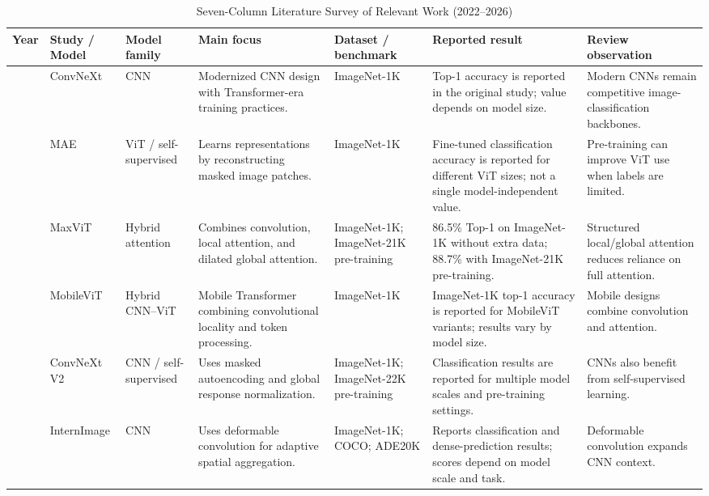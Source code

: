 \documentclass[conference]{IEEEtran}
\begin{document}
\begin{table}[!t]
\caption{Seven-Column Literature Survey of Relevant Work (2022--2026)}
\label{tab:recent_literature}
\centering
\tiny
\setlength{\tabcolsep}{2pt}
\renewcommand{\arraystretch}{0.95}
\begin{tabularx}{\textwidth}{|>{\centering\arraybackslash}p{0.48cm}|p{1.28cm}|p{1.22cm}|X|p{1.42cm}|p{1.38cm}|X|}
\hline
\textbf{Year} & \textbf{Study / Model} & \textbf{Model family} & \textbf{Main focus} & \textbf{Dataset / benchmark} & \textbf{Reported result} & \textbf{Review observation} \\
\hline
2022 & ConvNeXt \cite{liu2022convnext} & CNN & Modernized CNN design with Transformer-era training practices. & ImageNet-1K & Top-1 accuracy is reported in the original study; value depends on model size. & Modern CNNs remain competitive image-classification backbones. \\
\hline
2022 & MAE \cite{he2022mae} & ViT / self-supervised & Learns representations by reconstructing masked image patches. & ImageNet-1K & Fine-tuned classification accuracy is reported for different ViT sizes; not a single model-independent value. & Pre-training can improve ViT use when labels are limited. \\
\hline
2022 & MaxViT \cite{tu2022maxvit} & Hybrid attention & Combines convolution, local attention, and dilated global attention. & ImageNet-1K; ImageNet-21K pre-training & 86.5\% Top-1 on ImageNet-1K without extra data; 88.7\% with ImageNet-21K pre-training. & Structured local/global attention reduces reliance on full attention. \\
\hline
2022 & MobileViT \cite{mehta2022mobilevit} & Hybrid CNN--ViT & Mobile Transformer combining convolutional locality and token processing. & ImageNet-1K & ImageNet-1K top-1 accuracy is reported for MobileViT variants; results vary by model size. & Mobile designs combine convolution and attention. \\
\hline
2023 & ConvNeXt V2 \cite{woo2023convnextv2} & CNN / self-supervised & Uses masked autoencoding and global response normalization. & ImageNet-1K; ImageNet-22K pre-training & Classification results are reported for multiple model scales and pre-training settings. & CNNs also benefit from self-supervised learning. \\
\hline
2023 & InternImage \cite{wang2023internimage} & CNN & Uses deformable convolution for adaptive spatial aggregation. & ImageNet-1K; COCO; ADE20K & Reports classification and dense-prediction results; scores depend on model scale and task. & Deformable convolution expands CNN context. \\

\end{tabularx}
\end{table}
\end{document}
